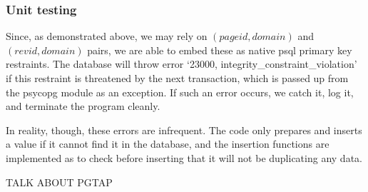 \subsubsection*{Unit testing}

Since, as demonstrated above, we may rely on $(pageid,domain)$ and
$(revid,domain)$ pairs, we are able to embed these as native psql
primary key restraints. The database will throw error `23000,
integrity\_constraint\_violation' if this restraint is threatened by
the next transaction, which is passed up from the psycopg module as an
exception.\cite{psql-error}\cite{psyc-error} If such an error occurs,
we catch it, log it, and terminate the program cleanly.

In reality, though, these errors are infrequent. The code only
prepares and inserts a value if it cannot find it in the database, and
the insertion functions are implemented as to check before inserting
that it will not be duplicating any data.

TALK ABOUT PGTAP
